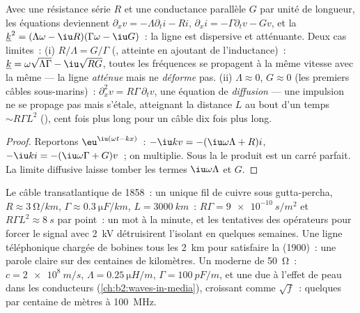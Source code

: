 \begin{proposition}\label{prop:b2:dispersion-wave-packets:lossy}
Avec une résistance série $R$ et une conductance parallèle $G$ par unité de
longueur, les équations deviennent $\partial_xv = -\Lambda\partial_ti - Ri$, $\partial_xi =
-\Gamma\partial_tv - Gv$, et la  $\underline k^2 = (\Lambda\omega -
\iu R)(\Gamma\omega - \iu G)$~: la ligne est dispersive et atténuante. Deux
cas limites~: (i) $R/\Lambda = G/\Gamma$ (, atteinte en ajoutant
de l'inductance)~: $\underline k = \omega\sqrt{\Lambda\Gamma} - \iu\sqrt{RG}$, toutes les fréquences
se propagent à la même vitesse avec la même  --- la ligne
\emph{atténue} mais ne \emph{déforme} pas. (ii) $\Lambda \approx 0$, $G \approx 0$
(les premiers câbles sous-marins)~: $\partial_x^2v = R\Gamma\,\partial_tv$, une
équation de \emph{diffusion} --- une impulsion ne se propage pas mais s'étale,
atteignant la distance $L$ au bout d'un temps $\sim R\Gamma L^2$ (), cent fois plus long pour un câble dix fois plus long.
\end{proposition}

\begin{proof}
Reportons $\eu^{\iu(\omega t - kx)}$~: $-\iu kv = -(\iu\omega\Lambda + R)i$, $-\iu ki = -(\iu
\omega\Gamma + G)v$~; on multiplie. Sous la  le produit est un
carré parfait. La limite diffusive laisse tomber les termes $\iu\omega\Lambda$ et $G$.
\end{proof}

\begin{example}\label{ex:b2:dispersion-wave-packets:cables}
Le câble transatlantique de 1858~: un unique fil de cuivre sous gutta-percha,
$R \approx \qty{3}{\ohm/km}$, $\Gamma \approx \qty{0.3}{\micro F/km}$, $L = \qty{3000}{km}$~:
$R\Gamma = \qty{9e-10}{s/m^2}$ et $R\Gamma L^2 \approx \qty{8}{s}$ par point~: un mot à la
minute, et les tentatives des opérateurs pour forcer le signal
avec \qty{2}{kV} détruisirent l'isolant en quelques semaines. Une ligne téléphonique
chargée de bobines tous les \qty{2}{km} pour satisfaire la 
(1900)~: une parole claire sur des centaines de kilomètres. Un 
moderne de \qty{50}{\ohm}~: $c = \qty{2e8}{m/s}$, $\Lambda = \qty{0.25}{\micro H/m}$, $\Gamma =
\qty{100}{pF/m}$, et une  due à l'effet de peau dans les
conducteurs (\cref{ch:b2:waves-in-media}), croissant comme $\sqrt f$~: quelques
 par centaine de mètres à \qty{100}{MHz}.
\end{example}

